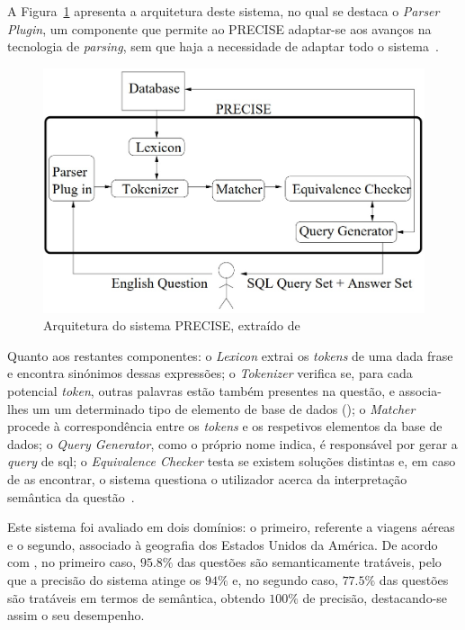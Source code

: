 A Figura~\ref{fig:precise_architecture} apresenta a arquitetura deste sistema, no qual se destaca o \textit{Parser Plugin}, um componente que permite ao PRECISE adaptar-se aos avanços na tecnologia de \textit{parsing}, sem que haja a necessidade de adaptar todo o sistema~\parencite{modern_nlidb_composing_statistical_parsing_semantic_tractability}. 

\begin{figure}[!ht]
    \centering
    \includegraphics[width=.65\textwidth]{ch03/assets/precise_architecture.jpg}
    \caption{Arquitetura do sistema PRECISE, extraído de~\textcite{towards_theory_nli_databases}}
    \label{fig:precise_architecture}
\end{figure}

Quanto aos restantes componentes: o \textit{Lexicon} extrai os \textit{tokens} de uma dada frase e encontra sinónimos dessas expressões; o \textit{Tokenizer} verifica se, para cada potencial \textit{token}, outras palavras estão também presentes na questão, e associa-lhes um um determinado tipo de elemento de base de dados (); o \textit{Matcher} procede à correspondência entre os \textit{tokens} e os respetivos elementos da base de dados; o \textit{Query Generator}, como o próprio nome indica, é responsável por gerar a \textit{query} de \gls{sql}; o \textit{Equivalence Checker} testa se existem soluções distintas e, em caso de as encontrar, o sistema questiona o utilizador acerca da interpretação semântica da questão~\parencite{towards_theory_nli_databases}.

Este sistema foi avaliado em dois domínios: o primeiro, referente a viagens aéreas e o segundo, associado à geografia dos Estados Unidos da América. De acordo com \textcite{nlidb_brief_review}, no primeiro caso, $95.8\%$ das questões são semanticamente tratáveis, pelo que a precisão do sistema atinge os $94\%$ e, no segundo caso, $77.5\%$ das questões são tratáveis em termos de semântica, obtendo $100\%$ de precisão, destacando-se assim o seu desempenho.

